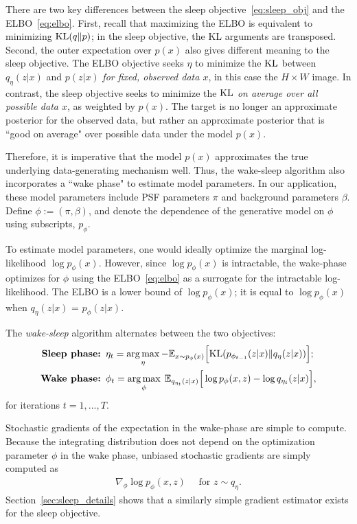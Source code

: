 There are two key differences between the sleep objective~\eqref{eq:sleep_obj} and the ELBO~\eqref{eq:elbo}. 
First, recall that maximizing the ELBO is equivalent to minimizing 
$\textrm{KL}(q\|p)$; in the sleep objective, the KL arguments are transposed. Second, the outer expectation over $p(x)$ also gives different meaning to the sleep objective. The ELBO objective seeks $\eta$ to minimize the $\textrm{KL}$ between $q_\eta(z | x)$ and $p(z | x)$ {\itshape for fixed, observed data $x$},
in this case the $H\times W$ image.
In contrast, the sleep objective seeks to minimize the $\textrm{KL}$ {\itshape on average over all possible data $x$}, as weighted by $p(x)$. 
The target is no longer an approximate posterior for the observed data, but rather an approximate posterior that is ``good on average" over possible data under the model $p(x)$.

Therefore, it is imperative that the model $p(x)$ approximates the true underlying data-generating mechanism well. 
Thus, the wake-sleep algorithm also incorporates a ``wake phase" to estimate model parameters.
In our application, these model parameters include PSF parameters $\pi$ and background parameters $\beta$. Define 
$\phi:=(\pi, \beta)$, and denote the dependence of the generative model on $\phi$ using subscripts, $p_\phi$. 

To estimate model parameters, one would ideally optimize the marginal log-likelihood $\log p_\phi(x)$.
However, since $\log p_\phi(x)$ is intractable, the wake-phase optimizes for $\phi$ using the ELBO~\eqref{eq:elbo}
as a surrogate for the intractable log-likelihood. 
The ELBO is a lower bound of
$\log p_\phi(x)$; 
it is equal to $\log p_\phi(x)$ when $q_\eta(z | x)$ 
= $p_\phi(z | x)$. 

The {\itshape wake-sleep} algorithm alternates between the two objectives: 
\begin{align}
    \text{{\bf Sleep phase: }} & 
    \eta_{t} = \operatorname*{arg\,max}_{\eta} -\mathbb{E}_{x \sim p_\phi(x)}\Big[\textrm{KL}(p_{\phi_{t-1}}(z | x) \| q_\eta(z | x))\Big]
    \label{eq:sleep_phase_summary}; 
    \\
    \text{{\bf Wake phase: }} & \phi_{t} = \operatorname*{arg\,max}_{\phi}\; \mathbb{E}_{q_{\eta_t}(z | x)}\Big[\log p_{\phi}(x, z) - \log q_{\eta_t}(z | x)\Big],
    \label{eq:wake_phase_summary}
\end{align} 
for iterations $t = 1, ..., T$. 

Stochastic gradients of the expectation in the wake-phase are simple to compute. Because the integrating distribution does not depend on the optimization parameter $\phi$ in the wake phase, unbiased stochastic gradients are simply computed as 
\begin{align}
    \nabla_\phi \log p_\phi(x, z) \quad \text{ for } z\sim q_\eta. 
    \label{eq:mstep_grad}
\end{align}
Section~\ref{sec:sleep_details} shows that a similarly simple gradient estimator exists for the sleep objective.


